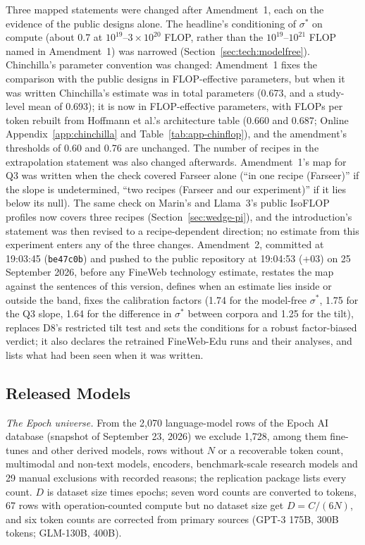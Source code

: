 Three mapped statements were changed after Amendment~1, each on the evidence of the public designs alone. The headline's
conditioning of $\sigma^*$ on compute (about 0.7 at $10^{19}$--$3\times10^{20}$ FLOP, rather than the
$10^{19}$--$10^{21}$ FLOP named in Amendment~1) was narrowed (Section~\ref{sec:tech:modelfree}). Chinchilla's parameter
convention was changed: Amendment~1 fixes the comparison with the public designs in FLOP-effective parameters, but when it
was written Chinchilla's estimate was in total parameters (0.673, and a study-level mean of 0.693); it is now in
FLOP-effective parameters, with FLOPs per token rebuilt from Hoffmann et al.'s architecture table (0.660 and 0.687; Online
Appendix~\ref{app:chinchilla} and Table~\ref{tab:app-chinflop}), and the amendment's thresholds of 0.60 and 0.76 are
unchanged. The number of recipes in the extrapolation statement was also changed afterwards. Amendment~1's map for Q3
was written when the check covered Farseer alone (``in one recipe (Farseer)'' if the slope is undetermined, ``two recipes
(Farseer and our experiment)'' if it lies below its null). The same check on Marin's and Llama~3's public IsoFLOP profiles
now covers three recipes (Section~\ref{sec:wedge-pi}), and the introduction's statement was then revised to a
recipe-dependent direction; no estimate from this experiment enters any of the three changes. Amendment~2, committed at
19:03:45 (\texttt{be47c0b}) and pushed to the public repository at 19:04:53 (+03) on 25 September 2026, before any FineWeb technology estimate,
restates the map against the sentences of this version, defines when an estimate lies inside or outside the band, fixes the calibration factors (1.74 for the model-free $\sigma^*$, 1.75 for the Q3 slope, 1.64 for the difference in
$\sigma^*$ between corpora and 1.25 for the tilt), replaces D8's restricted tilt test and sets the conditions for a robust
factor-biased verdict; it also declares the
retrained FineWeb-Edu runs and their analyses, and lists what had been seen when it was written.





\subsection{Released Models}\label{app:choices}

\textit{The Epoch universe.} From the 2,070 language-model rows of the Epoch AI database \citep{epochai2026data}
(snapshot of September 23, 2026) we exclude 1,728, among them fine-tunes and other derived models, rows without $N$ or a
recoverable token count, multimodal and non-text models, encoders, benchmark-scale research models and 29 manual exclusions
with recorded reasons; the replication package lists every count. $D$ is dataset size times epochs; seven word counts are
converted to tokens, 67 rows with operation-counted compute but no dataset size get $D=C/(6N)$, and six token counts are
corrected from primary sources (GPT-3 175B, 300B tokens; GLM-130B, 400B).

